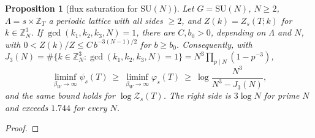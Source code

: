 \documentclass[11pt,a4paper]{amsart}
\newtheorem{proposition}[theorem]{Proposition}
\theoremstyle{definition}
\theoremstyle{remark}
\numberwithin{equation}{section}
\newcommand{\Z}{\mathbb{Z}}          %
\newcommand{\SU}{\mathrm{SU}}              %
\newcommand{\TT}{\mathbb{T}}               %
\newcommand{\Zc}{\mathcal{Z}}              %
\newcommand{\Zs}[2]{\Zc_{#1}(#2)}          %
\newcommand{\psiT}[2]{\psi_{#1}(#2)}       %
\newcommand{\betaW}{\beta_{W}}             %
\begin{document}
\begin{proposition}[flux saturation for $\SU(N)$]\label{prop:flux-saturation-N}
Let $G=\SU(N)$, $N\ge2$, $\Lambda=s\times\Z_T$ a periodic lattice with all sides $\ge2$, and $Z(k)=Z_s(T;k)$ for $k\in\Z_N^3$. If $\gcd(k_1,k_2,k_3,N)=1$, there are $C,b_0>0$, depending on $\Lambda$ and $N$, with $0<Z(k)/Z\le C\,b^{-3(N-1)/2}$ for $b\ge b_0$. Consequently, with $J_3(N)=\#\{k\in\Z_N^3:\gcd(k_1,k_2,k_3,N)=1\}=N^3\prod_{p\mid N}(1-p^{-3})$,
\[
\liminf_{\betaW\to\infty}\psiT sT\ \ge\ \liminf_{\betaW\to\infty}\varphi_s(T)\ \ge\ \log\frac{N^3}{N^3-J_3(N)},
\]
and the same bound holds for $\log\Zs sT$. The right side is $3\log N$ for prime $N$ and exceeds $1.744$ for every $N$.
\end{proposition}

\begin{proof}

\end{proof}
\end{document}
